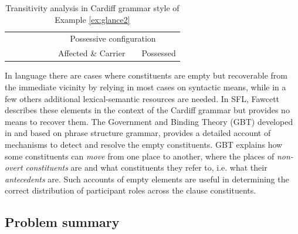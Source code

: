 \begin{table}[!ht]
{\begin{tabular}{cccccc|c|c|c|c|c|}
                &                             &                                      &                         & \multicolumn{1}{c|}{}               & \multicolumn{6}{c|}{Possessive configuration}                                                         \\ \cline{6-11} 
                &                             &                                      &                         &                                     &                & Affected \& Carrier &                  & \multicolumn{3}{c|}{Possessed}                 \\ \cline{7-7} \cline{9-11} 
            \end{tabular}%
        }
        \caption{Transitivity analysis in Cardiff grammar style \citep{Neale2002,Fawcett2009} of Example \ref{ex:glance2}} 
            \label{tab:glance-analsys-semantic}
        \end{table}
    
    In language there are cases where constituents are empty but recoverable from the immediate vicinity by relying in most cases on syntactic means, while in a few others additional lexical-semantic resources are needed.
    In SFL, Fawcett describes these elements in the context of the Cardiff grammar \citep[115,135,194]{Fawcett2008} but provides no means to recover them. The Government and Binding Theory (GBT) developed in \citet{Chomsky81, Chomsky1982, Chomsky1986} and based on phrase structure grammar, provides a detailed account of mechanisms to detect and resolve the empty constituents. GBT explains how some constituents can \textit{move} from one place to another, where the places of \textit{non-overt constituents} are and what constituents they refer to, i.e. what their \textit{antecedents} are. Such accounts of empty elements are useful in determining the correct distribution of participant roles across the clause constituents.

\subsection{Problem summary}
    
